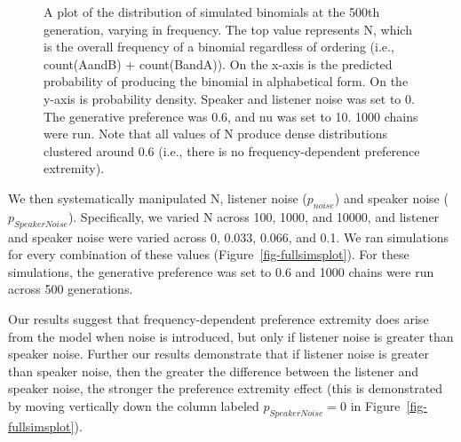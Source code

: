 \documentclass[
  12pt,
  letterpaper,
]{scrreprt}
\begin{document}
\begin{figure}[htbp]

\caption{\label{fig-noNoisePlot}A plot of the distribution of simulated
binomials at the 500th generation, varying in frequency. The top value
represents N, which is the overall frequency of a binomial regardless of
ordering (i.e., count(AandB) + count(BandA)). On the x-axis is the
predicted probability of producing the binomial in alphabetical form. On
the y-axis is probability density. Speaker and listener noise was set to
0. The generative preference was 0.6, and nu was set to 10. 1000 chains
were run. Note that all values of N produce dense distributions
clustered around 0.6 (i.e., there is no frequency-dependent preference
extremity).}


\end{figure}%

We then systematically manipulated N, listener noise (\(p_{noise}\)) and
speaker noise (\(p_{SpeakerNoise}\)). Specifically, we varied N across
100, 1000, and 10000, and listener and speaker noise were varied across
0, 0.033, 0.066, and 0.1. We ran simulations for every combination of
these values (Figure~\ref{fig-fullsimsplot}). For these simulations, the
generative preference was set to 0.6 and 1000 chains were run across 500
generations.

Our results suggest that frequency-dependent preference extremity does
arise from the model when noise is introduced, but only if listener
noise is greater than speaker noise. Further our results demonstrate
that if listener noise is greater than speaker noise, then the greater
the difference between the listener and speaker noise, the stronger the
preference extremity effect (this is demonstrated by moving vertically
down the column labeled \(p_{SpeakerNoise} = 0\) in
Figure~\ref{fig-fullsimsplot}).
\end{document}
